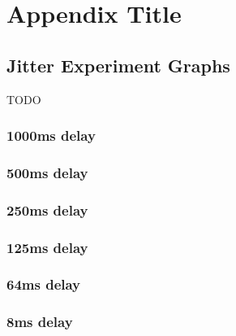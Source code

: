 \chapter{Appendix Title}

\section{Jitter Experiment Graphs}
TODO

\subsection{1000ms delay}

\subsection{500ms delay}

\subsection{250ms delay}

\subsection{125ms delay}

\subsection{64ms delay}

\subsection{8ms delay}
